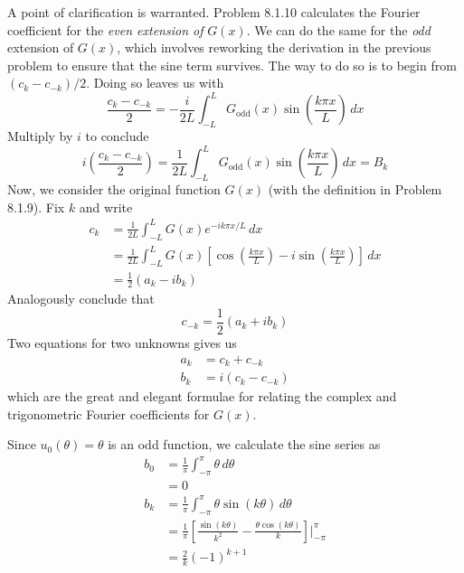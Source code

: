 \documentclass[a4paper]{article}
\begin{document}
A point of clarification is warranted. Problem 8.1.10 calculates the Fourier coefficient for the \textit{even extension of} \( G \!\left( x \right) \). We can do the same for the \textit{odd} extension of \( G \!\left( x \right) \), which involves reworking the derivation in the previous problem to ensure that the sine term survives. The way to do so is to begin from \( \!\left( c_{k} - c_{-k} \right) / 2 \). Doing so leaves us with
\[
	\frac{c_{k} - c_{-k}}{2} = -\frac{i}{2L} \int^{L}_{-L} G_{\text{odd}}\!\left( x \right)\sin\!\left(\frac{k \pi x }{L}\right) \, dx
\]
Multiply by \( i \) to conclude
\[
	i \!\left( \frac{c_{k} - c_{-k}}{2} \right) = \frac{1}{2L} \int^{L}_{-L} G_{\text{odd}}\!\left( x \right) \sin\!\left(\frac{k \pi x }{L}\right) \, dx = B_{k}
\]
Now, we consider the original function \( G \!\left( x \right) \) (with the definition in Problem 8.1.9). Fix \( k \) and write
\begin{align*}
	c_{k} & = \frac{1}{2L} \int^{L}_{-L} G \!\left( x \right) e^{-ik \pi x / L} \, dx \\
	 & = \frac{1}{2L} \int^{L}_{-L} G \!\left( x \right) \!\left[ \cos\!\left(\frac{k \pi x}{L}\right) - i \sin\!\left(\frac{k \pi x}{L}\right) \right] \, dx \\ 
	 & = \frac{1}{2} \!\left( a_{k} - i b_{k} \right)
\end{align*}
Analogously conclude that
\[
	c_{-k} = \frac{1}{2} \!\left( a_{k} + i b_{k} \right) 
\]
Two equations for two unknowns gives us
\begin{align*}
	a_{k} & = c_{k} + c_{-k} \\
	b_{k} & = i \!\left( c_{k} - c_{-k} \right)
\end{align*}
which are the great and elegant formulae for relating the complex and trigonometric Fourier coefficients for \( G \!\left( x \right) \).

\vspace{12pt}


Since \( u_{0} \!\left( \theta \right) = \theta \) is an odd function, we calculate the sine series as 
\begin{align*}
	b_{0} & = \frac{1}{\pi} \int^{\pi}_{-\pi} \theta \, d \theta \\
	 & = 0 \\ 
	b_{k} & = \frac{1}{\pi} \int^{\pi}_{-\pi} \theta \sin\!\left(k \theta\right) \, d \theta \\
	      & = \frac{1}{\pi} \!\left[ \frac{\sin\!\left(k \theta\right)}{k^{2}} - \frac{\theta \cos\!\left(k \theta\right)}{k} \right] \Big|^{\pi}_{-\pi} \\
	      & = \frac{2}{k}\!\left( -1 \right)^{k + 1}
\end{align*}
\end{document}
